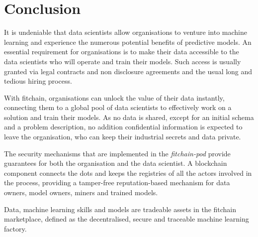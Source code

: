 \documentclass[12pt, a4paper,titlepage]{extreport}
\begin{document}
\pagebreak
\section{Conclusion}
It is undeniable that data scientists allow organisations to venture into machine learning and experience the numerous potential benefits of predictive models. An essential requirement for organisations is to make their data accessible to the data scientists who will operate and train their models. Such access is usually granted via legal contracts and non disclosure agreements and the usual long and tedious hiring process. 

With fitchain, organisations can unlock the value of their data instantly, connecting them to a global pool of data scientists to effectively work on a solution and train their models. As no data is shared, except for an initial schema and a problem description, no addition confidential information is expected to leave the organisation, who can keep their industrial secrets and data private.

The security mechanisms that are implemented in the \textit{fitchain-pod} provide guarantees for both the organisation and the data scientist. A blockchain component connects the dots and keeps the registries of all the actors involved in the process, providing a tamper-free reputation-based mechanism for data owners, model owners, miners and trained models.

Data, machine learning skills and models are tradeable assets in the fitchain marketplace, defined as the decentralised, secure and traceable machine learning factory.


%
%
%
%




\end{document}
